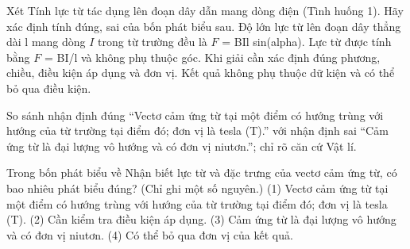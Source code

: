\begin{ex}
Xét Tính lực từ tác dụng lên đoạn dây dẫn mang dòng điện (Tình huống 1). Hãy xác định tính đúng, sai của bốn phát biểu sau.
\choiceTF
{\True Độ lớn lực từ lên đoạn dây thẳng dài l mang dòng $I$ trong từ trường đều là $F$ = BIl sin(alpha).}
{Lực từ được tính bằng $F$ = BI/l và không phụ thuộc góc.}
{\True Khi giải cần xác định đúng phương, chiều, điều kiện áp dụng và đơn vị.}
{Kết quả không phụ thuộc dữ kiện và có thể bỏ qua điều kiện.}
\end{ex}

\begin{bt}
So sánh nhận định đúng “Vectơ cảm ứng từ tại một điểm có hướng trùng với hướng của từ trường tại điểm đó; đơn vị là tesla (T).” với nhận định sai “Cảm ứng từ là đại lượng vô hướng và có đơn vị niutơn.”; chỉ rõ căn cứ Vật lí.
\end{bt}

\begin{ex}
Trong bốn phát biểu về Nhận biết lực từ và đặc trưng của vectơ cảm ứng từ, có bao nhiêu phát biểu đúng? (Chỉ ghi một số nguyên.) (1) Vectơ cảm ứng từ tại một điểm có hướng trùng với hướng của từ trường tại điểm đó; đơn vị là tesla (T). (2) Cần kiểm tra điều kiện áp dụng. (3) Cảm ứng từ là đại lượng vô hướng và có đơn vị niutơn. (4) Có thể bỏ qua đơn vị của kết quả.
\end{ex}

